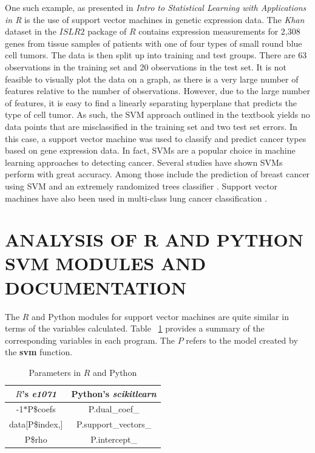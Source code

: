 \documentclass[12pt]{article}
\begin{document}
One such example, as presented in \textit{Intro to Statistical Learning with Applications in R} \citep{introstatlearning} is the use of support vector machines in genetic expression data. The \textit{Khan} dataset in the $ISLR2$ package of $R$ contains expression measurements for 2,308 genes from tissue samples of patients with one of four types of small round blue cell tumors. The data is then split up into training and test groups. There are 63 observations in the training set and 20 observations in the test set. It is not feasible to visually plot the data on a graph, as there is a very large number of features relative to the number of observations. However, due to the large number of features, it is easy to find a linearly separating hyperplane that predicts the type of cell tumor. As such, the SVM approach outlined in the textbook yields no data points that are misclassified in the training set and two test set errors. In this case, a support vector machine was used to classify and predict cancer types based on gene expression data. In fact, SVMs are a popular choice in machine learning approaches to detecting cancer. Several studies have shown SVMs perform with great accuracy. Among those include the prediction of breast cancer using SVM and an extremely randomized trees classifier \cite{breastcancer}. Support vector machines have also been used in multi-class lung cancer classification \cite{lungcancer}.

\section{ANALYSIS OF R AND PYTHON SVM MODULES AND DOCUMENTATION}

The $R$ and Python modules for support vector machines are quite similar in terms of the variables calculated. Table ~\ref{tab_r_python} provides a summary of the corresponding variables in each program. The $P$ refers to the model created by the \textbf{svm} function. 

\begin{table}[H]
    \centering
    \def\arraystretch{1.5}
    \begin{tabular}{c|c}
        $R$'s \textit{e1071} & Python's \textit{scikitlearn} \\
        \hline
        -1$*$P\$coefs & P.dual\_coef\_ \\
        data[P\$index,] & P.support\_vectors\_ \\
        P\$rho & P.intercept\_
    \end{tabular}
    \caption{Parameters in $R$ and Python}
    \label{tab_r_python}
\end{table}

\newpage
\thispagestyle{empty}


\end{document}
